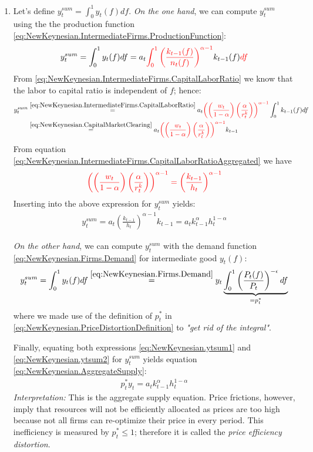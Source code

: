 \begin{enumerate}
\item Let's define $y_t^{sum} = \int_{0}^1 y_t(f) df$.
\emph{On the one hand}, we can compute $y_t^{sum}$ using the the production function \eqref{eq:NewKeynesian.IntermediateFirms.ProductionFunction}:
\begin{align*}
y_t^{sum} = \int_{0}^1 y_t(f) df = a_t {\color{red} \int_0^1 \left(\frac{k_{t-1}(f)}{n_{t}(f)}\right)^{\alpha-1}} k_{t-1}(f) {\color{red}df}
\end{align*}
From \eqref{eq:NewKeynesian.IntermediateFirms.CapitalLaborRatio} we know that the labor to capital ratio is independent of $f$; hence:
\begin{align*}
y_t^{sum}  
&\overset{\eqref{eq:NewKeynesian.IntermediateFirms.CapitalLaborRatio}}{=} a_t {\color{red}\left( \left(\frac{w_t}{1-\alpha}\right) \left(\frac{\alpha}{r^k_t}\right) \right)^{\alpha-1}} \int_0^1 k_{t-1}(f)df
\\
&\overset{\eqref{eq:NewKeynesian.CapitalMarketClearing}}{=} a_t {\color{red}\left( \left(\frac{w_t}{1-\alpha}\right) \left(\frac{\alpha}{r^k_t}\right) \right)^{\alpha-1}} k_{t-1}
\end{align*}
From equation \eqref{eq:NewKeynesian.IntermediateFirms.CapitalLaborRatioAggregated} we have
\begin{align*}
\color{red}{\left( \left(\frac{w_t}{1-\alpha}\right) \left(\frac{\alpha}{r^k_t}\right) \right)^{\alpha-1} } = \left(\frac{k_{t-1}}{h_t}\right)^{\alpha-1}
\end{align*}
Inserting into the above expression for $y_t^{sum}$ yields:
\begin{align}
y_t^{sum} = a_t \left(\frac{k_{t-1}}{h_t}\right)^{\alpha-1} k_{t-1} = a_t k_{t-1}^{\alpha} h_t^{1-\alpha} \label{eq:NewKeynesian.ytsum1}
\end{align}

\emph{On the other hand}, we can compute $y_t^{sum}$ with the demand function \eqref{eq:NewKeynesian.Firms.Demand} for intermediate good $y_t(f)$:
\begin{align}
y_t^{sum} = \int_{0}^1 y_t(f) df \overset{\eqref{eq:NewKeynesian.Firms.Demand}}{=} y_t \underbrace{\int_{0}^1 \left(\frac{P_t(f)}{P_t}\right)^{-\epsilon} df}_{=p_t^*} \label{eq:NewKeynesian.ytsum2}
\end{align}
where we made use of the definition of $p_t^*$ in \eqref{eq:NewKeynesian.PriceDistortionDefinition} to \emph{"get rid of the integral"}.

Finally, equating both expressions \eqref{eq:NewKeynesian.ytsum1} and \eqref{eq:NewKeynesian.ytsum2} for $y_t^{sum}$ yields equation \eqref{eq:NewKeynesian.AggregateSupply}:
\begin{align*}
p_t^* y_t =  a_t k_{t-1}^{\alpha} h_t^{1-\alpha}
\end{align*}
\emph{Interpretation:} This is the aggregate supply equation.
Price frictions, however, imply that resources will not be efficiently allocated
  as prices are too high because not all firms can re-optimize their price in every period.
This inefficiency is measured by $p_t^*\leq 1$; therefore it is called the \emph{price efficiency distortion}.


\end{enumerate}
